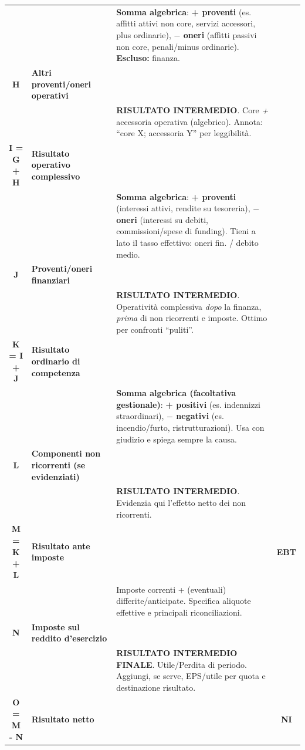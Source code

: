 \documentclass[a4paper,10pt]{article}
\begin{document}
\begin{table}[H]
{\begin{tabular}{|c|l|V{0.22\textwidth}|c|}
            & & \tiny \textbf{Somma algebrica}: \textbf{+ proventi} (es. affitti attivi non core, servizi accessori, plus ordinarie), \textbf{$-$ oneri} (affitti passivi non core, penali/minus ordinarie). \textbf{Escluso:} finanza. & \\
            \textbf{H} & \textbf{Altri proventi/oneri operativi} & & \\
            

            & & \tiny \textbf{RISULTATO INTERMEDIO}. Core \emph{+} accessoria operativa (algebrico). Annota: “core X; accessoria Y” per leggibilità. & \\
            \textbf{I = G + H} & \textbf{Risultato operativo complessivo} & & \\
            \hline

            & & \tiny \textbf{Somma algebrica}: \textbf{+ proventi} (interessi attivi, rendite su tesoreria), \textbf{$-$ oneri} (interessi su debiti, commissioni/spese di funding). Tieni a lato il tasso effettivo: oneri fin. / debito medio. & \\
            \textbf{J} & \textbf{Proventi/oneri finanziari} & & \\
            

            & & \tiny \textbf{RISULTATO INTERMEDIO}. Operatività complessiva \emph{dopo} la finanza, \emph{prima} di non ricorrenti e imposte. Ottimo per confronti “puliti”. & \\
            \textbf{K = I + J} & \textbf{Risultato ordinario di competenza} & & \\
            \hline

            & & \tiny \textbf{Somma algebrica (facoltativa gestionale)}: \textbf{+ positivi} (es. indennizzi straordinari), \textbf{$-$ negativi} (es. incendio/furto, ristrutturazioni). Usa con giudizio e spiega sempre la causa. & \\
            \textbf{L} & \textbf{Componenti non ricorrenti (se evidenziati)} & & \\
            

            & & \tiny \textbf{RISULTATO INTERMEDIO}. Evidenzia qui l’effetto netto dei non ricorrenti. & \\
            \textbf{M = K + L} & \textbf{Risultato ante imposte} & & \textbf{EBT} \\
            \hline

            & & \tiny Imposte correnti + (eventuali) differite/anticipate. Specifica aliquote effettive e principali riconciliazioni. & \\
            \textbf{N} & \textbf{Imposte sul reddito d’esercizio} & & \\
            

            & & \tiny \textbf{RISULTATO INTERMEDIO FINALE}. Utile/Perdita di periodo. Aggiungi, se serve, EPS/utile per quota e destinazione risultato. & \\
            \textbf{O = M - N} & \textbf{Risultato netto} & & \textbf{NI} \\
            \hline
        \end{tabular}
    }
\end{table}
\end{document}

